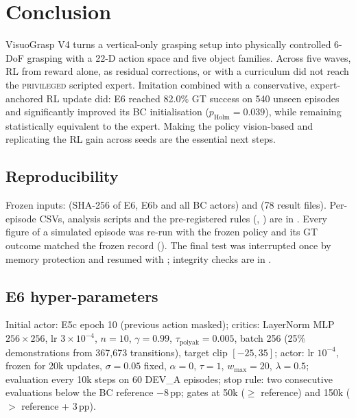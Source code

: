 \documentclass[conference,10pt]{IEEEtran}
\newcommand{\priv}{\textsc{privileged}}
\newcommand{\pp}{\,pp}
\begin{document}
\section{Conclusion}\label{sec:conclusion}
VisuoGrasp V4 turns a vertical-only grasping setup into physically controlled 6-DoF grasping with a 22-D action space and five
object families. Across five waves, RL from reward alone, as residual corrections, or with a curriculum did not reach the
\priv{} scripted expert. Imitation combined with a conservative, expert-anchored RL update did: E6 reached 82.0\% GT success
on 540 unseen episodes and significantly improved its BC initialisation ($p_{\text{Holm}}=0.039$), while remaining
statistically equivalent to the expert. Making the policy vision-based and replicating the RL gain across seeds are the
essential next steps.

\FloatBarrier



\appendix
\sloppy
\subsection{Reproducibility}
Frozen inputs:  (SHA-256 of E6, E6b and all BC actors) and
 (78 result files). Per-episode CSVs, analysis scripts and the pre-registered
rules (, ) are in
. Every figure of a simulated episode was re-run with the frozen policy and its GT
outcome matched the frozen record (). The final test was
interrupted once by memory protection and resumed with ; integrity checks are in
.

\subsection{E6 hyper-parameters}
Initial actor: E5c epoch 10 (previous action masked); critics: LayerNorm MLP $256\times256$, lr $3\times10^{-4}$, $n=10$,
$\gamma=0.99$, $\tau_{\text{polyak}}=0.005$, batch 256 (25\% demonstrations from 367{,}673 transitions), target clip $[-25,35]$;
actor: lr $10^{-4}$, frozen for 20k updates, $\sigma=0.05$ fixed, $\alpha=0$, $\tau=1$, $w_{\max}=20$, $\lambda=0.5$;
evaluation every 10k steps on 60 DEV\_A episodes; stop rule: two consecutive evaluations below the BC reference $-8$\pp; gates at
50k ($\ge$ reference) and 150k ($>$ reference + 3\pp).
\end{document}
